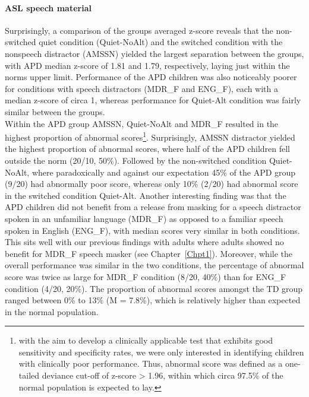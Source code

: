 \documentclass[a4paper, twoside]{templates/ociamthesis}
\begin{document}
\hypertarget{asl-speech-material}{%
\paragraph*{ASL speech material}\label{asl-speech-material}}

\hfill\break
Surprisingly, a comparison of the groups averaged z-score reveals that the non-switched quiet condition (Quiet-NoAlt) and the switched condition with the nonspeech distractor (AMSSN) yielded the largest separation between the groups, with APD median z-score of 1.81 and 1.79, respectively, laying just within the norms upper limit. Performance of the APD children was also noticeably poorer for conditions with speech distractors (MDR\_F and ENG\_F), each with a median z-score of circa 1, whereas performance for Quiet-Alt condition was fairly similar between the groups.\\

Within the APD group AMSSN, Quiet-NoAlt and MDR\_F resulted in the highest proportion of abnormal scores\footnote{with the aim to develop a clinically applicable test that exhibits good sensitivity and specificity rates, we were only interested in identifying children with clinically poor performance. Thus, abnormal score was defined as a one-tailed deviance cut-off of z-score \textgreater{} 1.96, within which circa 97.5\% of the normal population is expected to lay.}. Surprisingly, AMSSN distractor yielded the highest proportion of abnormal scores, where half of the APD children fell outside the norm (20/10, 50\%). Followed by the non-switched condition Quiet-NoAlt, where paradoxically and against our expectation 45\% of the APD group (9/20) had abnormally poor score, whereas only 10\% (2/20) had abnormal score in the switched condition Quiet-Alt. Another interesting finding was that the APD children did not benefit from a release from masking for a speech distractor spoken in an unfamiliar language (MDR\_F) as opposed to a familiar speech spoken in English (ENG\_F), with median scores very similar in both conditions. This sits well with our previous findings with adults where adults showed no benefit for MDR\_F speech masker (see Chapter~\ref{Chpt1}). Moreover, while the overall performance was similar in the two conditions, the percentage of abnormal score was twice as large for MDR\_F condition (8/20, 40\%) than for ENG\_F condition (4/20, 20\%). The proportion of abnormal scores amongst the TD group ranged between 0\% to 13\% (M = 7.8\%), which is relatively higher than expected in the normal population.\\
\end{document}
